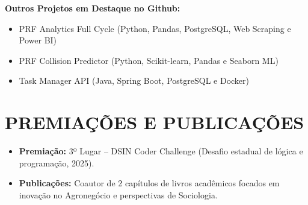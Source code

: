 \documentclass[11pt,a4paper]{article}
\begin{document}
\textbf{Outros Projetos em Destaque no Github:}
\begin{itemize}
    \item PRF Analytics Full Cycle (Python, Pandas, PostgreSQL, Web Scraping e Power BI)
    \item PRF Collision Predictor (Python, Scikit-learn, Pandas e Seaborn ML)
    \item Task Manager API (Java, Spring Boot, PostgreSQL e Docker)
\end{itemize}

\vspace{0.2cm}
\section*{PREMIAÇÕES E PUBLICAÇÕES}
\begin{itemize}
    \item \textbf{Premiação:} 3º Lugar -- DSIN Coder Challenge (Desafio estadual de lógica e programação, 2025).
    \item \textbf{Publicações:} Coautor de 2 capítulos de livros acadêmicos focados em inovação no Agronegócio e perspectivas de Sociologia.
\end{itemize}
\end{document}
